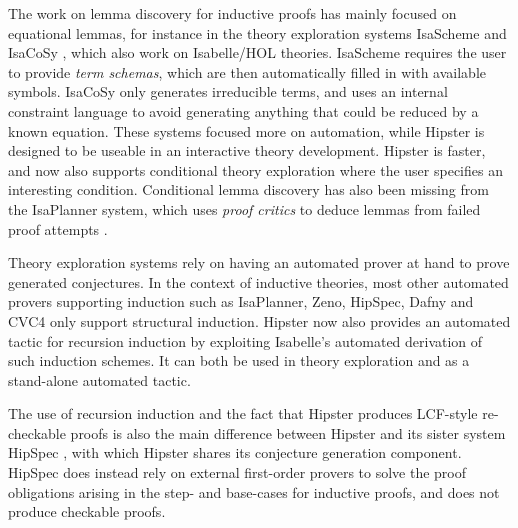 \label{sec:related}

The work on lemma discovery for inductive proofs has mainly focused on equational lemmas, for instance in the theory exploration systems IsaScheme and IsaCoSy \cite{isascheme,isacosy}, which also work on Isabelle/HOL theories.
%
IsaScheme requires the user to provide \emph{term schemas}, which are then automatically filled in with available symbols.
%
IsaCoSy only generates irreducible terms, and uses an internal constraint language to avoid generating anything that could be reduced by a known equation.
%
These systems focused more on automation, while Hipster is designed to be useable in an interactive theory development.
%
Hipster is faster, and now also supports conditional theory exploration where the user specifies an interesting condition.
%
Conditional lemma discovery has also been missing from the IsaPlanner system, which uses \emph{proof critics} to deduce lemmas from failed proof attempts \cite{isaplanner2,IsaPcase}. 

Theory exploration systems rely on having an automated prover at hand to prove generated conjectures.
%
In the context of inductive theories, most other automated provers supporting induction such as IsaPlanner, Zeno, HipSpec, Dafny and CVC4 \cite{isaplanner2, zeno, hipspecCADE, dafny, cvc4} only support structural induction.
%
Hipster now also provides an automated tactic for recursion induction by exploiting Isabelle's automated derivation of such induction schemes.
%
It can both be used in theory exploration and as a stand-alone automated tactic.

The use of recursion induction and the fact that Hipster produces LCF-style re-checkable proofs is also the main difference between Hipster and its sister system HipSpec \cite{hipspecCADE}, with which Hipster shares its conjecture generation component.
%
HipSpec does instead rely on external first-order provers to solve the proof obligations arising in the step- and base-cases for inductive proofs, and does not produce checkable proofs.
